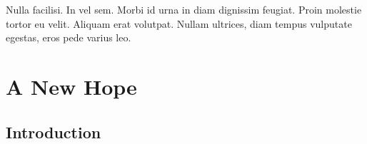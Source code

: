 \graphicspath{{figures/chapter-5/}}


\begin{savequote}[75mm]
Nulla facilisi. In vel sem. Morbi id urna in diam dignissim feugiat. Proin molestie tortor eu velit. Aliquam erat volutpat. Nullam    ultrices, diam tempus vulputate egestas, eros pede varius leo.
\end{savequote}

\chapter{A New Hope}


\section{Introduction}

\lipsum[1]
\cite{Salmon2006}


